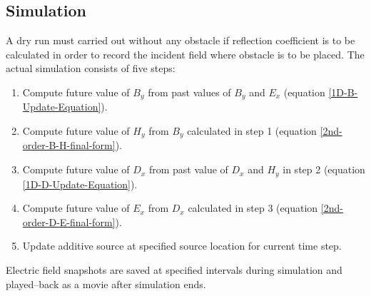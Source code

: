 \subsection{Simulation}
A dry run must carried out without any obstacle if reflection coefficient is to be calculated in order to record the incident field where obstacle is to be placed. The actual simulation consists of five steps:
\begin{enumerate}
\item Compute future value of $B_y$ from past values of $B_y$ and $E_x$ (equation \ref{1D-B-Update-Equation}).
\item Compute future value of $H_y$ from $B_y$ calculated in step 1 (equation \ref{2nd-order-B-H-final-form}).
\item Compute future value of $D_x$ from past value of $D_x$ and $H_y$ in step 2 (equation \ref{1D-D-Update-Equation}).
\item Compute future value of $E_x$ from $D_x$ calculated in step 3 (equation \ref{2nd-order-D-E-final-form}).
\item Update additive source at specified source location for current time step.
\end{enumerate}
Electric field snapshots are saved at specified intervals during simulation and played--back as a movie after simulation ends. 
